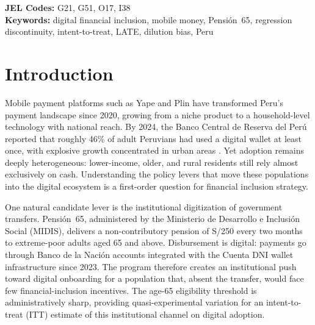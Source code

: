 \documentclass[12pt]{article}
\begin{document}
\begin{abstract}
As a complementary identification strategy (Block~F), we construct a
PCA-based proxy of the SISFOH welfare index from ENAHO household
characteristics and implement a second RDD using this index as the
running variable on adults aged $\ge 65$ ($N=14{,}088$). This design,
following \citet{bando2020}, yields $N_h\!=\!3{,}201$ effective
observations and a null estimate of $+0.004$ (SE~$=0.015$) with
well-balanced covariates. Robustness checks on the full sample---donut
holes, bandwidth sensitivity, polynomial sensitivity, placebo outcomes,
and permutation inference (randomization $p=0.94$)---are broadly
consistent. Covariate balance at the age-65 cutoff in the full sample is
clean: no predetermined covariate exhibits a significant discontinuity,
strengthening the identification assumption relative to the extreme-poor
subsample.
\end{abstract}

\textbf{JEL Codes:} G21, G51, O17, I38 \\
\textbf{Keywords:} digital financial inclusion, mobile money, Pensi\'on~65,
regression discontinuity, intent-to-treat, LATE, dilution bias, Peru

\newpage

\section{Introduction}
\label{sec:introduction}

Mobile payment platforms such as Yape and Plin have transformed Peru's
payment landscape since 2020, growing from a niche product to a
household-level technology with national reach. By 2024, the Banco Central
de Reserva del Per\'u reported that roughly 46\% of adult Peruvians had
used a digital wallet at least once, with explosive growth concentrated in
urban areas \citep{bcrp2024report}. Yet adoption remains deeply
heterogeneous: lower-income, older, and rural residents still rely almost
exclusively on cash. Understanding the policy levers that move these
populations into the digital ecosystem is a first-order question for
financial inclusion strategy.

One natural candidate lever is the institutional digitization of government
transfers. Pensi\'on~65, administered by the Ministerio de Desarrollo e
Inclusi\'on Social (MIDIS), delivers a non-contributory pension of S/250
every two months to extreme-poor adults aged 65 and above. Disbursement is
digital: payments go through Banco de la Naci\'on accounts integrated with
the Cuenta DNI wallet infrastructure since 2023. The program therefore
creates an institutional push toward digital onboarding for a population
that, absent the transfer, would face few financial-inclusion incentives.
The age-65 eligibility threshold is administratively sharp, providing
quasi-experimental variation for an intent-to-treat (ITT) estimate of this
institutional channel on digital adoption.
\end{document}
